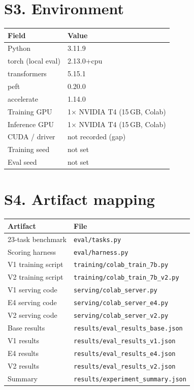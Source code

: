\documentclass[11pt]{article}
\begin{document}
\section*{S3. Environment}
\begin{tabular}{ll}
\toprule
Field & Value \\
\midrule
Python & 3.11.9 \\
torch (local eval) & 2.13.0+cpu \\
transformers & 5.15.1 \\
peft & 0.20.0 \\
accelerate & 1.14.0 \\
Training GPU & 1$\times$ NVIDIA T4 (15\,GB, Colab) \\
Inference GPU & 1$\times$ NVIDIA T4 (15\,GB, Colab) \\
CUDA / driver & not recorded (gap) \\
Training seed & not set \\
Eval seed & not set \\
\bottomrule
\end{tabular}

\section*{S4. Artifact mapping}
\begin{tabular}{ll}
\toprule
Artifact & File \\
\midrule
23-task benchmark & \texttt{eval/tasks.py} \\
Scoring harness & \texttt{eval/harness.py} \\
V1 training script & \texttt{training/colab\_train\_7b.py} \\
V2 training script & \texttt{training/colab\_train\_7b\_v2.py} \\
V1 serving code & \texttt{serving/colab\_server.py} \\
E4 serving code & \texttt{serving/colab\_server\_e4.py} \\
V2 serving code & \texttt{serving/colab\_server\_v2.py} \\
Base results & \texttt{results/eval\_results\_base.json} \\
V1 results & \texttt{results/eval\_results\_v1.json} \\
E4 results & \texttt{results/eval\_results\_e4.json} \\
V2 results & \texttt{results/eval\_results\_v2.json} \\
Summary & \texttt{results/experiment\_summary.json} \\
\bottomrule
\end{tabular}
\end{document}
